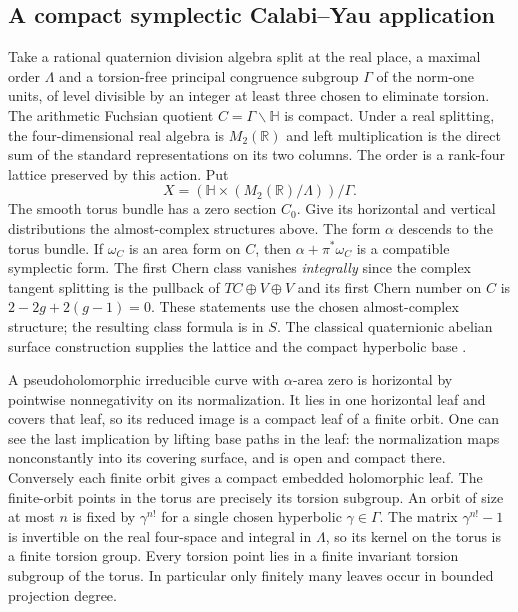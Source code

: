 \subsection{A compact symplectic Calabi–Yau application}

Take a rational quaternion division algebra split at the real place, a maximal order \(\Lambda\) and a torsion-free principal congruence subgroup \(\Gamma\) of the norm-one units, of level divisible by an integer at least three chosen to eliminate torsion. The arithmetic Fuchsian quotient \(C=\Gamma\backslash\mathbb H\) is compact. Under a real splitting, the four-dimensional real algebra is \(M_2(\mathbb R)\) and left multiplication is the direct sum of the standard representations on its two columns. The order is a rank-four lattice preserved by this action. Put
\[X=(\mathbb H\times(M_2(\mathbb R)/\Lambda))/\Gamma .\]
The smooth torus bundle has a zero section \(C_0\). Give its horizontal and vertical distributions the almost-complex structures above. The form \(\alpha\) descends to the torus bundle. If \(\omega_C\) is an area form on \(C\), then \(\alpha+\pi^*\omega_C\) is a compatible symplectic form. The first Chern class vanishes \emph{integrally} since the complex tangent splitting is the pullback of \(TC\oplus V\oplus V\) and its first Chern number on \(C\) is \(2-2g+2(g-1)=0\). These statements use the chosen almost-complex structure; the resulting class formula is in \(S\). The classical quaternionic abelian surface construction supplies the lattice and the compact hyperbolic base \cite{voight}.

A pseudoholomorphic irreducible curve with \(\alpha\)-area zero is horizontal by pointwise nonnegativity on its normalization. It lies in one horizontal leaf and covers that leaf, so its reduced image is a compact leaf of a finite orbit. One can see the last implication by lifting base paths in the leaf: the normalization maps nonconstantly into its covering surface, and is open and compact there. Conversely each finite orbit gives a compact embedded holomorphic leaf. The finite-orbit points in the torus are precisely its torsion subgroup. An orbit of size at most \(n\) is fixed by \(\gamma^{n!}\) for a single chosen hyperbolic \(\gamma\in\Gamma\). The matrix \(\gamma^{n!}-1\) is invertible on the real four-space and integral in \(\Lambda\), so its kernel on the torus is a finite torsion group. Every torsion point lies in a finite invariant torsion subgroup of the torus. In particular only finitely many leaves occur in bounded projection degree.

